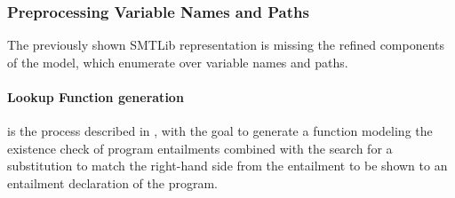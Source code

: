 \subsubsection{Preprocessing Variable Names and Paths}
The previously shown SMTLib representation is
missing the refined components of the model,
which enumerate over variable names and paths.

\paragraph{Lookup Function generation}
is the process described in ,
with the goal to generate a function modeling
the existence check of program entailments
combined with the search for a substitution
to match the right-hand side from the entailment
to be shown to an entailment declaration of the program.

